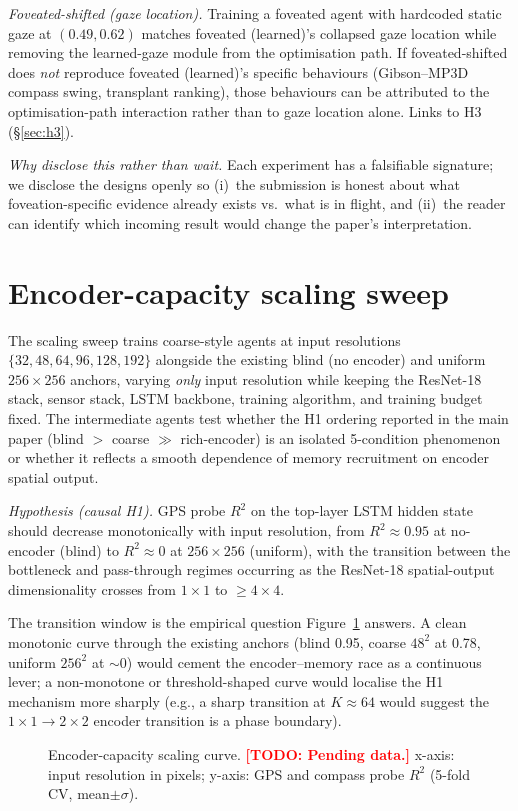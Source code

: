 \documentclass{article}
\newcommand{\TODO}[1]{\textcolor{red}{\textbf{[TODO: #1]}}}
\newcommand{\hcpending}[1]{{\color{hcpendingcol}#1}}
\begin{document}
\emph{Foveated-shifted (gaze location).} Training a foveated agent with hardcoded static gaze at $(0.49, 0.62)$ matches foveated (learned)'s collapsed gaze location while removing the learned-gaze module from the optimisation path. If foveated-shifted does \emph{not} reproduce foveated (learned)'s specific behaviours (Gibson--MP3D compass swing, transplant ranking), those behaviours can be attributed to the optimisation-path interaction rather than to gaze location alone. Links to H3 (§\ref{sec:h3}).

\emph{Why disclose this rather than wait.} Each experiment has a falsifiable signature; we disclose the designs openly so (i)~the submission is honest about what foveation-specific evidence already exists vs.\ what is in flight, and (ii)~the reader can identify which incoming result would change the paper's interpretation.


\section{Encoder-capacity scaling sweep}
\label{app:scaling}

The scaling sweep trains coarse-style agents at input resolutions $\{32, 48, 64, 96, 128, 192\}$ alongside the existing blind (no encoder) and uniform $256{\times}256$ anchors, varying \emph{only} input resolution while keeping the ResNet-18 stack, sensor stack, LSTM backbone, training algorithm, and training budget fixed. The intermediate agents test whether the H1 ordering reported in the main paper (blind $>$ coarse $\gg$ rich-encoder) is an isolated 5-condition phenomenon or whether it reflects a smooth dependence of memory recruitment on encoder spatial output.

\hcpending{\emph{Hypothesis (causal H1).} GPS probe $R^2$ on the top-layer LSTM hidden state should decrease monotonically with input resolution, from $R^2 \approx 0.95$ at no-encoder (blind) to $R^2 \approx 0$ at $256{\times}256$ (uniform), with the transition between the bottleneck and pass-through regimes occurring as the ResNet-18 spatial-output dimensionality crosses from $1{\times}1$ to $\geq 4{\times}4$.}

\hcpending{The transition window is the empirical question Figure~\ref{fig:scaling} answers. A clean monotonic curve through the existing anchors (blind 0.95, coarse $48^2$ at 0.78, uniform $256^2$ at $\sim 0$) would cement the encoder--memory race as a continuous lever; a non-monotone or threshold-shaped curve would localise the H1 mechanism more sharply (e.g., a sharp transition at $K \approx 64$ would suggest the $1{\times}1 \to 2{\times}2$ encoder transition is a phase boundary).}

\begin{figure}[h]
\centering
\fbox{\rule{0pt}{4cm}\rule{0.8\linewidth}{0pt}}
\caption{Encoder-capacity scaling curve. \TODO{Pending data.} x-axis: input resolution in pixels; y-axis: GPS and compass probe $R^2$ (5-fold CV, mean$\pm\sigma$).}
\label{fig:scaling}
\end{figure}
\end{document}
